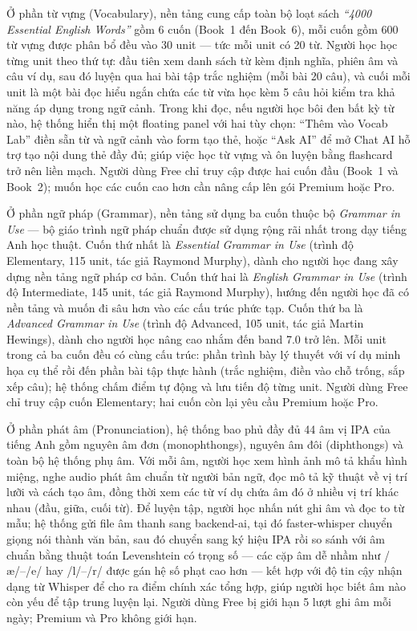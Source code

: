 Ở phần từ vựng (Vocabulary), nền tảng cung cấp toàn bộ loạt sách \textit{``4000 Essential English Words''} gồm 6 cuốn (Book~1 đến Book~6), mỗi cuốn gồm 600 từ vựng được phân bổ đều vào 30 unit --- tức mỗi unit có 20 từ. Người học học từng unit theo thứ tự: đầu tiên xem danh sách từ kèm định nghĩa, phiên âm và câu ví dụ, sau đó luyện qua hai bài tập trắc nghiệm (mỗi bài 20 câu), và cuối mỗi unit là một bài đọc hiểu ngắn chứa các từ vừa học kèm 5 câu hỏi kiểm tra khả năng áp dụng trong ngữ cảnh. Trong khi đọc, nếu người học bôi đen bất kỳ từ nào, hệ thống hiển thị một floating panel với hai tùy chọn: ``Thêm vào Vocab Lab'' điền sẵn từ và ngữ cảnh vào form tạo thẻ, hoặc ``Ask AI'' để mở Chat AI hỗ trợ tạo nội dung thẻ đầy đủ; giúp việc học từ vựng và ôn luyện bằng flashcard trở nên liền mạch. Người dùng Free chỉ truy cập được hai cuốn đầu (Book~1 và Book~2); muốn học các cuốn cao hơn cần nâng cấp lên gói Premium hoặc Pro.

Ở phần ngữ pháp (Grammar), nền tảng sử dụng ba cuốn thuộc bộ \textit{Grammar in Use} --- bộ giáo trình ngữ pháp chuẩn được sử dụng rộng rãi nhất trong dạy tiếng Anh học thuật. Cuốn thứ nhất là \textit{Essential Grammar in Use} (trình độ Elementary, 115 unit, tác giả Raymond Murphy), dành cho người học đang xây dựng nền tảng ngữ pháp cơ bản. Cuốn thứ hai là \textit{English Grammar in Use} (trình độ Intermediate, 145 unit, tác giả Raymond Murphy), hướng đến người học đã có nền tảng và muốn đi sâu hơn vào các cấu trúc phức tạp. Cuốn thứ ba là \textit{Advanced Grammar in Use} (trình độ Advanced, 105 unit, tác giả Martin Hewings), dành cho người học nâng cao nhắm đến band 7.0 trở lên. Mỗi unit trong cả ba cuốn đều có cùng cấu trúc: phần trình bày lý thuyết với ví dụ minh họa cụ thể rồi đến phần bài tập thực hành (trắc nghiệm, điền vào chỗ trống, sắp xếp câu); hệ thống chấm điểm tự động và lưu tiến độ từng unit. Người dùng Free chỉ truy cập cuốn Elementary; hai cuốn còn lại yêu cầu Premium hoặc Pro.

Ở phần phát âm (Pronunciation), hệ thống bao phủ đầy đủ 44 âm vị IPA của tiếng Anh gồm nguyên âm đơn (monophthongs), nguyên âm đôi (diphthongs) và toàn bộ hệ thống phụ âm. Với mỗi âm, người học xem hình ảnh mô tả khẩu hình miệng, nghe audio phát âm chuẩn từ người bản ngữ, đọc mô tả kỹ thuật về vị trí lưỡi và cách tạo âm, đồng thời xem các từ ví dụ chứa âm đó ở nhiều vị trí khác nhau (đầu, giữa, cuối từ). Để luyện tập, người học nhấn nút ghi âm và đọc to từ mẫu; hệ thống gửi file âm thanh sang backend-ai, tại đó faster-whisper chuyển giọng nói thành văn bản, sau đó chuyển sang ký hiệu IPA rồi so sánh với âm chuẩn bằng thuật toán Levenshtein có trọng số --- các cặp âm dễ nhầm như /æ/--/e/ hay /l/--/r/ được gán hệ số phạt cao hơn --- kết hợp với độ tin cậy nhận dạng từ Whisper để cho ra điểm chính xác tổng hợp, giúp người học biết âm nào còn yếu để tập trung luyện lại. Người dùng Free bị giới hạn 5 lượt ghi âm mỗi ngày; Premium và Pro không giới hạn.

